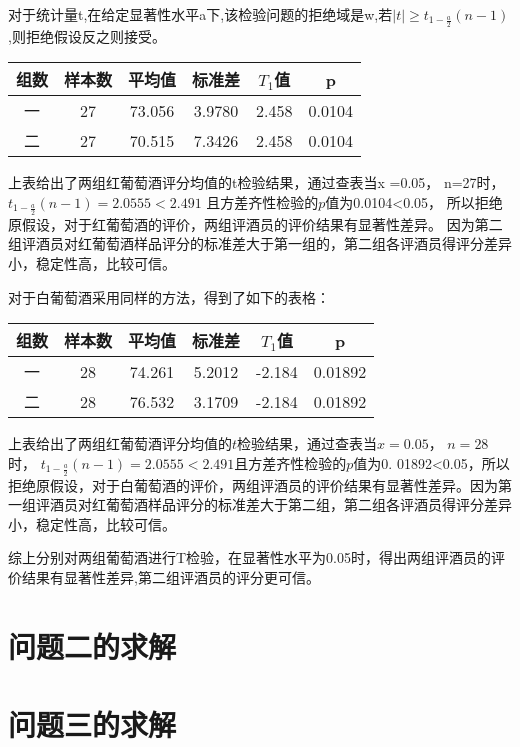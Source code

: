 \documentclass[UTF8]{ctexart}
\begin{document}
对于统计量t,在给定显著性水平a下,该检验问题的拒绝域是w,若${\mid t \mid \ge t_{1-\frac{a}{2}}(n-1)}$,则拒绝假设反之则接受。

\begin{center}
	\begin{tabular}{||c c c c c c||}
		\hline
		组数 & 样本数 & 平均值 & 标准差 & $T_1$值 & p      \\ [0.5ex]
		\hline
		一   & 27     & 73.056 & 3.9780 & 2.458   & 0.0104 \\
		\hline
		二   & 27     & 70.515 & 7.3426 & 2.458   & 0.0104 \\
		\hline
	\end{tabular}
\end{center}

上表给出了两组红葡萄酒评分均值的t检验结果，通过查表当x =0.05， n=27时， $t_{1-\frac{a}{2}}(n-1)=2.0555<2.491$
且方差齐性检验的$p$值为0.0104<0.05，
所以拒绝原假设，对于红葡萄酒的评价，两组评酒员的评价结果有显著性差异。
因为第二组评酒员对红葡萄酒样品评分的标准差大于第一组的，第二组各评酒员得评分差异小，稳定性高，比较可信。

对于白葡萄酒采用同样的方法，得到了如下的表格：
\begin{center}
	\begin{tabular}{||c c c c c c||}
		\hline
		组数 & 样本数 & 平均值 & 标准差 & $T_1$值 & p       \\ [0.5ex]
		\hline
		一   & 28     & 74.261 & 5.2012 & -2.184  & 0.01892 \\
		\hline
		二   & 28     & 76.532 & 3.1709 & -2.184  & 0.01892 \\
		\hline
	\end{tabular}
\end{center}

上表给出了两组红葡萄酒评分均值的$t$检验结果，通过查表当$x=0.05$， $n=28$时， $t_{1-\frac{a}{2}}(n-1)=2.0555<2.491$且方差齐性检验的$p$值为0. 01892<0.05，所以拒绝原假设，对于白葡萄酒的评价，两组评酒员的评价结果有显著性差异。因为第一组评酒员对红葡萄酒样品评分的标准差大于第二组，第二组各评酒员得评分差异小，稳定性高，比较可信。

综上分别对两组葡萄酒进行T检验\cite{de2013using}，在显著性水平为0.05时，得出两组评酒员的评价结果有显著性差异,第二组评酒员的评分更可信。


\section{问题二的求解}

\section{问题三的求解}
\end{document}
